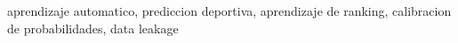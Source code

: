 \begin{abstract}
\textit{Resumen preliminar.} %
\end{abstract}

\begin{IEEEkeywords}
aprendizaje automatico, prediccion deportiva, aprendizaje de ranking,
calibracion de probabilidades, data leakage
\end{IEEEkeywords}
